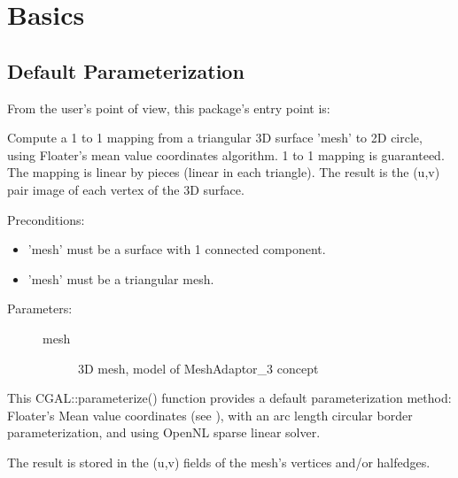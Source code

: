 \section{Basics}


\subsection{Default Parameterization}

From the user's point of view, this package's entry point is:

{
Compute a 1 to 1 mapping from a triangular 3D surface 'mesh' to 2D circle, using
Floater's mean value coordinates algorithm. 1 to 1 mapping is guaranteed.
The mapping is linear by pieces (linear in each triangle). The result is the (u,v) pair image of each vertex of the 3D surface.

Preconditions:\begin{itemize}
\item 'mesh' must be a surface with 1 connected component.\item 'mesh' must be a triangular mesh.\end{itemize}
}
\begin{description}
\item[Parameters: ]
\begin{description}
\item[mesh]3D mesh, model of MeshAdaptor\_3 concept \end{description}
\end{description}

This CGAL::parameterize() function provides a default parameterization method: Floater's
Mean value coordinates (see \cite{cgal:f-mvc-03}), with an arc length circular border
parameterization, and using OpenNL sparse linear solver.

The result is stored in the (u,v) fields of the mesh's vertices and/or halfedges.

